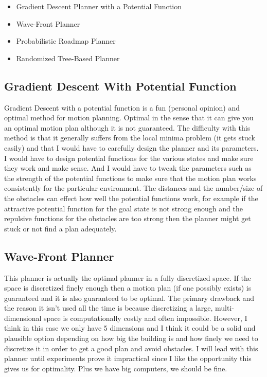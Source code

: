 \documentclass{article}
\begin{document}
\begin{itemize}
    \item Gradient Descent Planner with a Potential Function
    \item Wave-Front Planner
    \item Probabilistic Roadmap Planner
    \item Randomized Tree-Based Planner
\end{itemize}

\subsection{Gradient Descent With Potential Function}

Gradient Descent with a potential function is a fun (personal opinion) and optimal method for motion planning.
Optimal in the sense that it can give you an optimal motion plan although it is not guaranteed.
The difficulty with this method is that it generally suffers from the local minima problem (it gets stuck easily) and that I would have to carefully design the planner and its parameters.
I would have to design potential functions for the various states and make sure they work and make sense.
And I would have to tweak the parameters such as the strength of the potential functions to make sure that the motion plan works consistently for the particular environment.
The distances and the number/size of the obstacles can effect how well the potential functions work, for example if the attractive potential function for the goal state is not strong enough and the repulsive functions for the obstacles are too strong then the planner might get stuck or not find a plan adequately.

\subsection{Wave-Front Planner}

This planner is actually the optimal planner in a fully discretized space.
If the space is discretized finely enough then a motion plan (if one possibly exists) is guaranteed and it is also guaranteed to be optimal.
The primary drawback and the reason it isn't used all the time is because discretizing a large, multi-dimensional space is computationally costly and often impossible.
However, I think in this case we only have 5 dimensions and I think it could be a solid and plausible option depending on how big the building is and how finely we need to discretize it in order to get a good plan and avoid obstacles.
I will lead with this planner until experiments prove it impractical since I like the opportunity this gives us for optimality.
Plus we have big computers, we should be fine.
\end{document}

